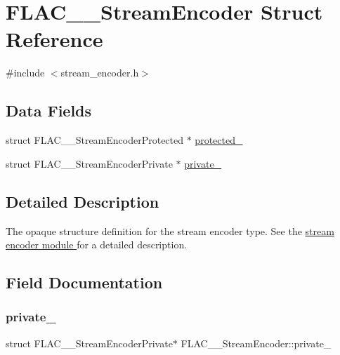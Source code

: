 \hypertarget{struct_f_l_a_c_____stream_encoder}{}\section{F\+L\+A\+C\+\_\+\+\_\+\+Stream\+Encoder Struct Reference}
\label{struct_f_l_a_c_____stream_encoder}


{\ttfamily \#include $<$stream\+\_\+encoder.\+h$>$}

\subsection*{Data Fields}
\begin{DoxyCompactItemize}
\item 
struct F\+L\+A\+C\+\_\+\+\_\+\+Stream\+Encoder\+Protected $\ast$ \hyperlink{struct_f_l_a_c_____stream_encoder_a2820d2ad5c6395289b2abc7dc7399f76}{protected\+\_\+}
\item 
struct F\+L\+A\+C\+\_\+\+\_\+\+Stream\+Encoder\+Private $\ast$ \hyperlink{struct_f_l_a_c_____stream_encoder_a6cc84bcaa3049936b459f5f2362b9076}{private\+\_\+}
\end{DoxyCompactItemize}


\subsection{Detailed Description}
The opaque structure definition for the stream encoder type. See the \hyperlink{group__flac__stream__encoder}{stream encoder module } for a detailed description. 

\subsection{Field Documentation}
\mbox{\label{struct_f_l_a_c_____stream_encoder_a6cc84bcaa3049936b459f5f2362b9076}} 
\subsubsection{\texorpdfstring{private\+\_\+}{private\_}}
{\footnotesize\ttfamily struct F\+L\+A\+C\+\_\+\+\_\+\+Stream\+Encoder\+Private$\ast$ F\+L\+A\+C\+\_\+\+\_\+\+Stream\+Encoder\+::private\+\_\+}

